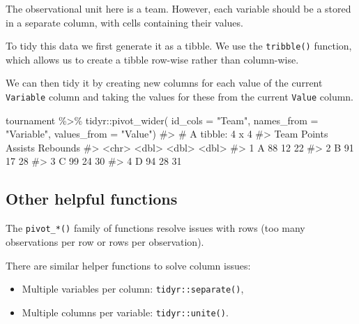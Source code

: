 \documentclass[
  letterpaper,
  DIV=11,
  numbers=noendperiod]{scrreprt}
\newenvironment{Shaded}{\begin{snugshade}}{\end{snugshade}}
\newcommand{\AttributeTok}[1]{\textcolor[rgb]{0.40,0.45,0.13}{#1}}
\newcommand{\CommentTok}[1]{\textcolor[rgb]{0.37,0.37,0.37}{#1}}
\newcommand{\FunctionTok}[1]{\textcolor[rgb]{0.28,0.35,0.67}{#1}}
\newcommand{\NormalTok}[1]{\textcolor[rgb]{0.00,0.23,0.31}{#1}}
\newcommand{\SpecialCharTok}[1]{\textcolor[rgb]{0.37,0.37,0.37}{#1}}
\newcommand{\StringTok}[1]{\textcolor[rgb]{0.13,0.47,0.30}{#1}}
\begin{document}
The observational unit here is a team. However, each variable should be
a stored in a separate column, with cells containing their values.

To tidy this data we first generate it as a tibble. We use the
\texttt{tribble()} function, which allows us to create a tibble row-wise
rather than column-wise.

We can then tidy it by creating new columns for each value of the
current \texttt{Variable} column and taking the values for these from
the current \texttt{Value} column.

\begin{Shaded}
\begin{Highlighting}[]
\NormalTok{tournament }\SpecialCharTok{\%\textgreater{}\%} 
\NormalTok{  tidyr}\SpecialCharTok{::}\FunctionTok{pivot\_wider}\NormalTok{(}
    \AttributeTok{id\_cols =} \StringTok{"Team"}\NormalTok{, }
    \AttributeTok{names\_from =} \StringTok{"Variable"}\NormalTok{,}
    \AttributeTok{values\_from =} \StringTok{"Value"}\NormalTok{)}
\CommentTok{\#\textgreater{} \# A tibble: 4 x 4}
\CommentTok{\#\textgreater{}   Team  Points Assists Rebounds}
\CommentTok{\#\textgreater{}   \textless{}chr\textgreater{}  \textless{}dbl\textgreater{}   \textless{}dbl\textgreater{}    \textless{}dbl\textgreater{}}
\CommentTok{\#\textgreater{} 1 A         88      12       22}
\CommentTok{\#\textgreater{} 2 B         91      17       28}
\CommentTok{\#\textgreater{} 3 C         99      24       30}
\CommentTok{\#\textgreater{} 4 D         94      28       31}
\end{Highlighting}
\end{Shaded}

\subsection{Other helpful functions}\label{other-helpful-functions}

The \texttt{pivot\_*()} family of functions resolve issues with rows
(too many observations per row or rows per observation).

There are similar helper functions to solve column issues:

\begin{itemize}
\item
  Multiple variables per column: \texttt{tidyr::separate()},
\item
  Multiple columns per variable: \texttt{tidyr::unite()}.
\end{itemize}
\end{document}
